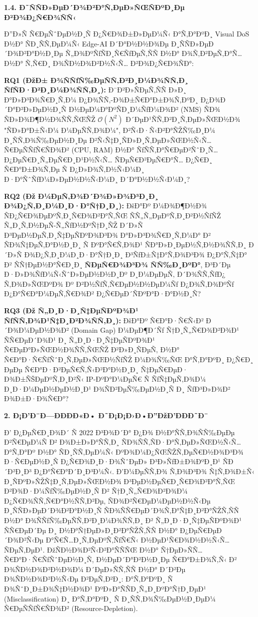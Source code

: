 \documentclass[]{article}
\begin{document}
\textbf{1.4. Ð˜ÑÑÐ»ÐµÐ´Ð¾Ð²Ð°Ñ‚ÐµÐ»ÑŒÑÐºÐ¸Ðµ Ð²Ð¾Ð¿Ñ€Ð¾ÑÑ‹}

Ð”Ð»Ñ Ñ€ÐµÑˆÐµÐ½Ð¸Ñ Ð¿Ñ€Ð¾Ð±Ð»ÐµÐ¼Ñ‹ Ð°Ñ‚Ð°ÐºÐ¸ Visual DoS Ð½Ð° ÑÐ¸ÑÑ‚ÐµÐ¼Ñ‹ Edge-AI Ð´Ð°Ð½Ð½Ð¾Ðµ Ð¸ÑÑÐ»ÐµÐ´Ð¾Ð²Ð°Ð½Ð¸Ðµ Ñ„Ð¾ÐºÑƒÑÐ¸Ñ€ÑƒÐµÑ‚ÑÑ Ð½Ð° Ð¾Ñ‚Ð²ÐµÑ‚Ð°Ñ… Ð½Ð° Ñ‚Ñ€Ð¸ Ð¾ÑÐ½Ð¾Ð²Ð½Ñ‹Ñ… Ð²Ð¾Ð¿Ñ€Ð¾ÑÐ°:

\textbf{RQ1 (ÐžÐ± Ð¾ÑÑƒÑ‰ÐµÑÑ‚Ð²Ð¸Ð¼Ð¾ÑÑ‚Ð¸ ÑƒÑÐ·Ð²Ð¸Ð¼Ð¾ÑÑ‚Ð¸):} Ð¯Ð²Ð»ÑÐµÑ‚ÑÑ Ð»Ð¸ Ð°Ð»Ð³Ð¾Ñ€Ð¸Ñ‚Ð¼ Ð¿Ð¾ÑÑ‚-Ð¾Ð±Ñ€Ð°Ð±Ð¾Ñ‚ÐºÐ¸ Ð¿Ð¾Ð´Ð°Ð²Ð»ÐµÐ½Ð¸Ñ Ð½ÐµÐ¼Ð°ÐºÑÐ¸Ð¼ÑƒÐ¼Ð¾Ð² (NMS) ÑÐ¾ ÑÐ»Ð¾Ð¶Ð½Ð¾ÑÑ‚ÑŒÑŽ \(\mathcal{O}\left( N^{2} \right)\) Ð´ÐµÐ¹ÑÑ‚Ð²Ð¸Ñ‚ÐµÐ»ÑŒÐ½Ð¾ "ÑÐ»Ð°Ð±Ñ‹Ð¼ Ð¼ÐµÑÑ‚Ð¾Ð¼", Ð²Ñ‹Ð·Ñ‹Ð²Ð°ÑŽÑ‰Ð¸Ð¼ Ð¸ÑÑ‚Ð¾Ñ‰ÐµÐ½Ð¸Ðµ Ð²Ñ‹Ñ‡Ð¸ÑÐ»Ð¸Ñ‚ÐµÐ»ÑŒÐ½Ñ‹Ñ… Ñ€ÐµÑÑƒÑ€ÑÐ¾Ð² (CPU, RAM) Ð½Ð° ÑƒÑÑ‚Ð°Ñ€ÐµÐ²ÑˆÐ¸Ñ… Ð¿ÐµÑ€Ð¸Ñ„ÐµÑ€Ð¸Ð¹Ð½Ñ‹Ñ… ÑÐµÑ€Ð²ÐµÑ€Ð°Ñ… Ð¿Ñ€Ð¸ Ñ€Ð°Ð±Ð¾Ñ‚Ðµ Ñ Ð¿Ð»Ð¾Ñ‚Ð½Ñ‹Ð¼Ð¸ Ð·Ð°ÑˆÑƒÐ¼Ð»ÐµÐ½Ð½Ñ‹Ð¼Ð¸ Ð´Ð°Ð½Ð½Ñ‹Ð¼Ð¸?

\textbf{RQ2 (Ðž Ð¼ÐµÑ‚Ð¾Ð´Ð¾Ð»Ð¾Ð³Ð¸Ð¸ Ð¾Ð¿Ñ‚Ð¸Ð¼Ð¸Ð·Ð°Ñ†Ð¸Ð¸):} ÐšÐ°Ðº Ð¼Ð¾Ð¶Ð½Ð¾ ÑÐ¿Ñ€Ð¾ÐµÐºÑ‚Ð¸Ñ€Ð¾Ð²Ð°Ñ‚ÑŒ ÑÑ„Ñ„ÐµÐºÑ‚Ð¸Ð²Ð½ÑƒÑŽ Ñ„Ð¸Ñ‚Ð½ÐµÑ-Ñ„ÑƒÐ½ÐºÑ†Ð¸ÑŽ Ð´Ð»Ñ Ð³ÐµÐ½ÐµÑ‚Ð¸Ñ‡ÐµÑÐºÐ¾Ð³Ð¾ Ð°Ð»Ð³Ð¾Ñ€Ð¸Ñ‚Ð¼Ð° Ð² ÑÐ¾Ñ‡ÐµÑ‚Ð°Ð½Ð¸Ð¸ Ñ ÐºÐ°Ñ€Ñ‚Ð¾Ð¹ ÑÐ°Ð»Ð¸ÐµÐ½Ñ‚Ð½Ð¾ÑÑ‚Ð¸ Ð´Ð»Ñ Ð¾Ð¿Ñ‚Ð¸Ð¼Ð¸Ð·Ð°Ñ†Ð¸Ð¸ Ð³ÑƒÐ±Ñ‡Ð°Ñ‚Ð¾Ð³Ð¾ Ð¿Ð°Ñ‚Ñ‡Ð° Ð² ÑÑ†ÐµÐ½Ð°Ñ€Ð¸Ð¸ \textbf{ÑÐµÑ€Ð¾Ð³Ð¾ ÑÑ‰Ð¸ÐºÐ°}, Ð³Ð´Ðµ Ð·Ð»Ð¾ÑƒÐ¼Ñ‹ÑˆÐ»ÐµÐ½Ð½Ð¸Ðº Ð¸Ð¼ÐµÐµÑ‚ Ð´Ð¾ÑÑ‚ÑƒÐ¿ Ñ‚Ð¾Ð»ÑŒÐºÐ¾ Ðº Ð²Ð½ÑƒÑ‚Ñ€ÐµÐ½Ð½ÐµÐ¼Ñƒ Ð¿Ð¾Ñ‚Ð¾ÐºÑƒ Ð¿Ð°Ñ€Ð°Ð¼ÐµÑ‚Ñ€Ð¾Ð² Ð¿Ñ€ÐµÐ´ÑÐºÐ°Ð·Ð°Ð½Ð¸Ñ?

\textbf{RQ3 (Ðž Ñ„Ð¸Ð·Ð¸Ñ‡ÐµÑÐºÐ¾Ð¹ ÑƒÑÑ‚Ð¾Ð¹Ñ‡Ð¸Ð²Ð¾ÑÑ‚Ð¸):} ÐšÐ°Ðº Ñ€Ð°Ð·Ñ€Ñ‹Ð² Ð´Ð¾Ð¼ÐµÐ½Ð¾Ð² (Domain Gap) Ð¼ÐµÐ¶Ð´Ñƒ Ñ†Ð¸Ñ„Ñ€Ð¾Ð²Ð¾Ð¹ ÑÑ€ÐµÐ´Ð¾Ð¹ Ð¸ Ñ„Ð¸Ð·Ð¸Ñ‡ÐµÑÐºÐ¾Ð¹ Ñ€ÐµÐ°Ð»ÑŒÐ½Ð¾ÑÑ‚ÑŒÑŽ Ð²Ð»Ð¸ÑÐµÑ‚ Ð½Ð° Ñ€Ð°Ð·Ñ€ÑƒÑˆÐ¸Ñ‚ÐµÐ»ÑŒÐ½ÑƒÑŽ Ð¼Ð¾Ñ‰ÑŒ Ð°Ñ‚Ð°ÐºÐ¸ Ð¿Ñ€Ð¸ ÐµÐµ Ñ€Ð°Ð·Ð²ÐµÑ€Ñ‚Ñ‹Ð²Ð°Ð½Ð¸Ð¸ Ñ‡ÐµÑ€ÐµÐ· Ð¾Ð±ÑŠÐµÐºÑ‚Ð¸Ð²Ñ‹ IP-ÐºÐ°Ð¼ÐµÑ€ Ñ ÑƒÑ‡ÐµÑ‚Ð¾Ð¼ Ð¸Ð·Ð¼ÐµÐ½ÐµÐ½Ð¸Ð¹ Ð¾ÑÐ²ÐµÑ‰ÐµÐ½Ð¸Ñ Ð¸ ÑƒÐ³Ð»Ð¾Ð² Ð¾Ð±Ð·Ð¾Ñ€Ð°?

\textbf{2. Ð¡Ð’Ð¯Ð—ÐÐÐÐ«Ð• Ð˜Ð¡Ð¡Ð›Ð•Ð”ÐžÐ’ÐÐÐ˜Ð¯}

Ð’ Ð¿ÐµÑ€Ð¸Ð¾Ð´ Ñ 2022 Ð³Ð¾Ð´Ð° Ð¿Ð¾ Ð½Ð°ÑÑ‚Ð¾ÑÑ‰ÐµÐµ Ð²Ñ€ÐµÐ¼Ñ Ð² Ð¾Ð±Ð»Ð°ÑÑ‚Ð¸ ÑÐ¾ÑÑ‚ÑÐ·Ð°Ñ‚ÐµÐ»ÑŒÐ½Ñ‹Ñ… Ð°Ñ‚Ð°Ðº Ð½Ð° ÑÐ¸ÑÑ‚ÐµÐ¼Ñ‹ ÐºÐ¾Ð¼Ð¿ÑŒÑŽÑ‚ÐµÑ€Ð½Ð¾Ð³Ð¾ Ð·Ñ€ÐµÐ½Ð¸Ñ Ð¿Ñ€Ð¾Ð¸Ð·Ð¾ÑˆÐµÐ» Ð³Ð»ÑƒÐ±Ð¾ÐºÐ¸Ð¹ ÑÐ´Ð²Ð¸Ð³ Ð¿Ð°Ñ€Ð°Ð´Ð¸Ð³Ð¼Ñ‹. Ð’Ð¼ÐµÑÑ‚Ð¾ Ñ‚Ð¾Ð³Ð¾ Ñ‡Ñ‚Ð¾Ð±Ñ‹ Ð¸ÑÐºÐ»ÑŽÑ‡Ð¸Ñ‚ÐµÐ»ÑŒÐ½Ð¾ Ð³ÐµÐ½ÐµÑ€Ð¸Ñ€Ð¾Ð²Ð°Ñ‚ÑŒ Ð²Ð¾Ð·Ð¼ÑƒÑ‰ÐµÐ½Ð¸Ñ Ð² Ñ†Ð¸Ñ„Ñ€Ð¾Ð²Ð¾Ð¼ Ð¿Ñ€Ð¾ÑÑ‚Ñ€Ð°Ð½ÑÑ‚Ð²Ðµ, ÑÐ¾Ð²Ñ€ÐµÐ¼ÐµÐ½Ð½Ñ‹Ðµ Ð¸ÑÑÐ»ÐµÐ´Ð¾Ð²Ð°Ð½Ð¸Ñ ÑÐ¾ÑÑ€ÐµÐ´Ð¾Ñ‚Ð°Ñ‡Ð¸Ð²Ð°ÑŽÑ‚ÑÑ Ð½Ð° Ð¾ÑÑƒÑ‰ÐµÑÑ‚Ð²Ð¸Ð¼Ð¾ÑÑ‚Ð¸ Ð² Ñ„Ð¸Ð·Ð¸Ñ‡ÐµÑÐºÐ¾Ð¹ ÑÑ€ÐµÐ´Ðµ Ð¸ Ð½Ð°Ñ†ÐµÐ»Ð¸Ð²Ð°ÑŽÑ‚ÑÑ Ð½Ð° Ð¿ÐµÑ€ÐµÐ´Ð¾Ð²Ñ‹Ðµ Ð°Ñ€Ñ…Ð¸Ñ‚ÐµÐºÑ‚ÑƒÑ€Ñ‹ Ð½ÐµÐ¹Ñ€Ð¾Ð½Ð½Ñ‹Ñ… ÑÐµÑ‚ÐµÐ¹. ÐžÑÐ½Ð¾Ð²Ñ‹Ð²Ð°ÑÑÑŒ Ð½Ð° Ñ†ÐµÐ»ÑÑ… Ñ€Ð°Ð·Ñ€ÑƒÑˆÐµÐ½Ð¸Ñ, Ð½ÐµÐ´Ð°Ð²Ð½Ð¸Ðµ Ñ€Ð°Ð±Ð¾Ñ‚Ñ‹ Ð² Ð¾ÑÐ½Ð¾Ð²Ð½Ð¾Ð¼ Ð´ÐµÐ»ÑÑ‚ÑÑ Ð½Ð° Ð´Ð²Ðµ Ð¾ÑÐ½Ð¾Ð²Ð½Ñ‹Ðµ Ð²ÐµÑ‚Ð²Ð¸: Ð°Ñ‚Ð°ÐºÐ¸ Ñ Ð¾ÑˆÐ¸Ð±Ð¾Ñ‡Ð½Ð¾Ð¹ ÐºÐ»Ð°ÑÑÐ¸Ñ„Ð¸ÐºÐ°Ñ†Ð¸ÐµÐ¹ (Misclassification) Ð¸ Ð°Ñ‚Ð°ÐºÐ¸ Ñ Ð¸ÑÑ‚Ð¾Ñ‰ÐµÐ½Ð¸ÐµÐ¼ Ñ€ÐµÑÑƒÑ€ÑÐ¾Ð² (Resource-Depletion).
\end{document}
